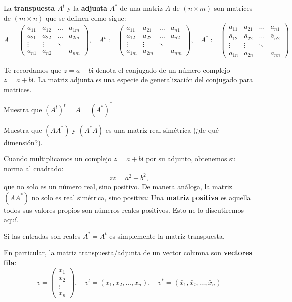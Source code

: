 La {\bf transpuesta $A^t$} y la {\bf adjunta} $A^*$ de una matriz $A$ de $(n\times m)$ son matrices de $(m\times n)$ que se definen como sigue:
$$A=
\left(\begin{array}{cccc}
    a_{11}& a_{12} & \dots & a_{1m} \\
    a_{21}& a_{22} & \dots &  a_{2m}\\
    \vdots& \vdots &\ddots &  \\
    a_{n1}& a_{n2} & & a_{nm}
\end{array} \right),
\quad
A^t:=
\left(\begin{array}{cccc}
    a_{11}& a_{21} & \dots & a_{n1} \\
    a_{12}& a_{22} & \dots &  a_{n2}\\
    \vdots& \vdots &\ddots &  \\
    a_{1m}& a_{2m} & & a_{nm}
\end{array} \right),
\quad 
A^*:=
\left(\begin{array}{cccc}
    \bar a_{11}& \bar a_{21} & \dots & \bar a_{n1} \\
    \bar a_{12}& \bar a_{22} & \dots &  \bar a_{n2}\\
    \vdots& \vdots &\ddots &  \\
    \bar a_{1n}& \bar a_{2n} & & \bar a_{nn}
\end{array} \right)
$$

Te recordamos que $\bar z=a-b\mathrm{i}$ denota el conjugado de un número complejo $z=a+b\mathrm{i}$. La matriz adjunta es una especie de generalización del conjugado para matrices.

\begin{ejercicio}
Muestra que $(A^t)^t=A=(A^*)^*$
\end{ejercicio}
\begin{ejercicio}
Muestra que $(AA^*)$ y $(A^*A)$ es una matriz real simétrica (¿de qué dimensión?). 
\end{ejercicio}

Cuando multiplicamos un complejo $z=a+b\mathrm{i}$ por su adjunto, obtenemos su norma al cuadrado: $$z\bar z=a^2+b^2,$$ que no solo es un número real, sino positivo. De manera análoga, la matriz $(AA^*)$ no solo es real simétrica, sino positiva: Una {\bf matriz positiva} es aquella todos sus valores propios son números reales positivos. Esto no lo discutiremos aquí.

Si las entradas son reales $A^*=A^t$ es simplemente la matriz transpuesta.

En particular, la matriz transpuesta/adjunta de un vector columna son {\bf vectores fila}: 
$$
v=
\left(\begin{array}{c}
    x_{1}\\
    x_{2}\\
    \vdots \\
    x_{n}
\end{array} \right)
,\quad
v^t=(x_{1}, x_{2}, \dots, x_{n})
,\quad
v^*=(\bar x_{1},\bar x_{2}, \dots, \bar x_{n})
$$

